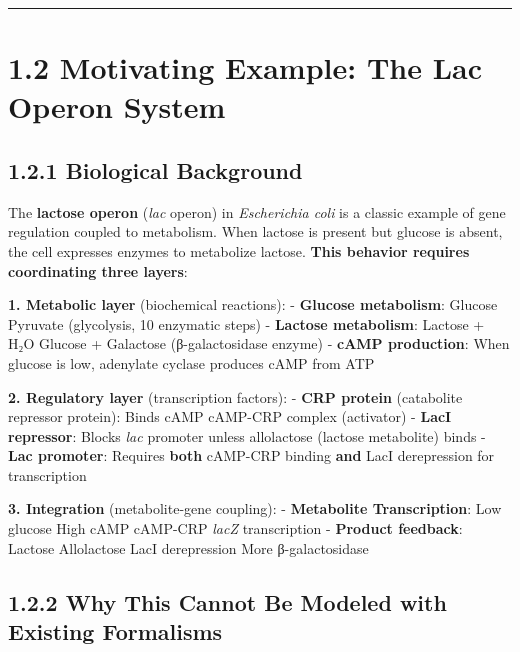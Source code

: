 \begin{center}\rule{0.5\linewidth}{0.5pt}\end{center}

\hypertarget{motivating-example-the-lac-operon-system}{%
\section{1.2 Motivating Example: The Lac Operon
System}\label{motivating-example-the-lac-operon-system}}

\hypertarget{biological-background}{%
\subsection{1.2.1 Biological Background}\label{biological-background}}

The \textbf{lactose operon} (\emph{lac} operon) in \emph{Escherichia
coli} is a classic example of gene regulation coupled to metabolism.
When lactose is present but glucose is absent, the cell expresses
enzymes to metabolize lactose. \textbf{This behavior requires
coordinating three layers}:

\textbf{1. Metabolic layer} (biochemical reactions): - \textbf{Glucose
metabolism}: Glucose \textrightarrow Pyruvate (glycolysis, 10 enzymatic steps) -
\textbf{Lactose metabolism}: Lactose + H₂O \textrightarrow Glucose + Galactose
(β-galactosidase enzyme) - \textbf{cAMP production}: When glucose is
low, adenylate cyclase produces cAMP from ATP

\textbf{2. Regulatory layer} (transcription factors): - \textbf{CRP
protein} (catabolite repressor protein): Binds cAMP \textrightarrow cAMP-CRP complex
(activator) - \textbf{LacI repressor}: Blocks \emph{lac} promoter unless
allolactose (lactose metabolite) binds - \textbf{Lac promoter}: Requires
\textbf{both} cAMP-CRP binding \textbf{and} LacI derepression for
transcription

\textbf{3. Integration} (metabolite-gene coupling): - \textbf{Metabolite
\textrightarrow Transcription}: Low glucose \textrightarrow High cAMP \textrightarrow cAMP-CRP \textrightarrow \emph{lacZ}
transcription - \textbf{Product feedback}: Lactose \textrightarrow Allolactose \textrightarrow LacI
derepression \textrightarrow More β-galactosidase

\hypertarget{why-this-cannot-be-modeled-with-existing-formalisms}{%
\subsection{1.2.2 Why This Cannot Be Modeled with Existing
Formalisms}\label{why-this-cannot-be-modeled-with-existing-formalisms}}

